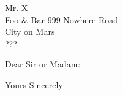 \documentclass{letter}
\begin{document}
\begin{letter}{Mr. X \\ Foo \& Bar 999 Nowhere Road
\\ City on Mars \\ ???}
\opening{Dear Sir or Madam:}

\blindtext

\closing{Yours Sincerely}

\end{letter}
\end{document}
